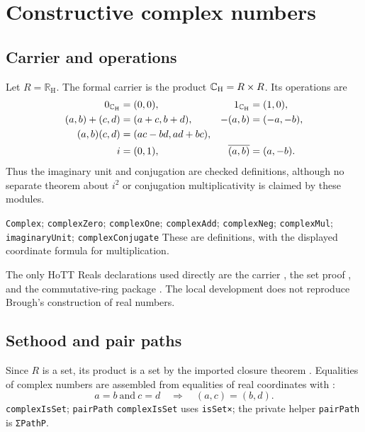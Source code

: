 \section{Constructive complex numbers}
\label{sec:complex}

\subsection{Carrier and operations}
Let $R=\mathbb{R}_{\mathrm H}$.  The formal carrier is the product
$\mathbb{C}_{\mathrm H}=R\times R$.  Its operations are
\begin{align}
0_{\mathbb{C}_{\mathrm H}}&=(0,0), & 1_{\mathbb{C}_{\mathrm H}}&=(1,0),\\
(a,b)+(c,d)&=(a+c,b+d), & -(a,b)&=(-a,-b),\\
(a,b)(c,d)&=(ac-bd,ad+bc),\\
i&=(0,1), & \overline{(a,b)}&=(a,-b).
\end{align}
Thus the imaginary unit and conjugation are checked definitions, although no
separate theorem about $i^2$ or conjugation multiplicativity is claimed by
these modules.

{\texttt{Complex}; \texttt{complexZero}; \texttt{complexOne}; \texttt{complexAdd}; \texttt{complexNeg}; \texttt{complexMul}; \texttt{imaginaryUnit}; \texttt{complexConjugate}}
{These are definitions, with the displayed coordinate formula for multiplication.}

The only HoTT Reals declarations used directly are the carrier
, the set proof
, and the commutative-ring package
.  The local development does not
reproduce Brough's construction of real numbers.


\subsection{Sethood and pair paths}
Since $R$ is a set, its product is a set by the imported closure theorem
.  Equalities of complex numbers are assembled from equalities
of real coordinates with :
\begin{equation}
 a=b\ \text{and}\ c=d\quad\Longrightarrow\quad(a,c)=(b,d).
\end{equation}
{\texttt{complexIsSet}; \texttt{pairPath}}
{\texttt{complexIsSet} uses \texttt{isSet×}; the private helper \texttt{pairPath} is \texttt{ΣPathP}.}

